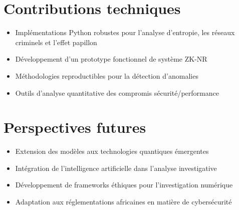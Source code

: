 \documentclass[12pt,a4paper]{article}
\begin{document}
\section{Contributions techniques}
\begin{itemize}
\item Implémentations Python robustes pour l'analyse d'entropie, les réseaux criminels et l'effet papillon
\item Développement d'un prototype fonctionnel de système ZK-NR
\item Méthodologies reproductibles pour la détection d'anomalies
\item Outils d'analyse quantitative des compromis sécurité/performance
\end{itemize}

\section{Perspectives futures}
\begin{itemize}
\item Extension des modèles aux technologies quantiques émergentes
\item Intégration de l'intelligence artificielle dans l'analyse investigative
\item Développement de frameworks éthiques pour l'investigation numérique
\item Adaptation aux réglementations africaines en matière de cybersécurité
\end{itemize}

\vspace{1cm}
\end{document}
